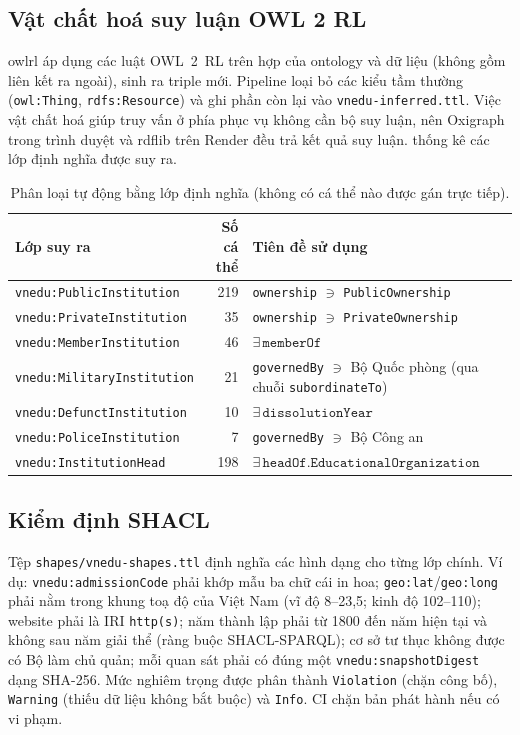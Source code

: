 \documentclass[12pt,a4paper]{article}
\newcommand{\vn}[1]{\texttt{vnedu:\allowbreak #1}}
\begin{document}
\subsection{Vật chất hoá suy luận OWL 2 RL}
owlrl áp dụng các luật OWL~2~RL trên hợp của ontology và dữ liệu (không gồm liên kết ra ngoài), sinh ra
\metricInferredTriples{} triple mới. Pipeline loại bỏ các kiểu tầm thường (\texttt{owl:Thing}, \texttt{rdfs:Resource}) và
ghi phần còn lại vào \texttt{vnedu-inferred.ttl}. Việc vật chất hoá giúp truy vấn ở phía phục vụ không cần bộ suy luận,
nên Oxigraph trong trình duyệt và rdflib trên Render đều trả kết quả suy luận.  thống kê các lớp định
nghĩa được suy ra.

\begin{table}[htbp]
\centering\small
\caption{Phân loại tự động bằng lớp định nghĩa (không có cá thể nào được gán trực tiếp).}\label{tab:inferred}
\begin{tabular}{lrl}
\toprule
Lớp suy ra & Số cá thể & Tiên đề sử dụng \\
\midrule
\vn{PublicInstitution}   & 219 & \texttt{ownership} \(\ni\) \texttt{PublicOwnership} \\
\vn{PrivateInstitution}  &  35 & \texttt{ownership} \(\ni\) \texttt{PrivateOwnership} \\
\vn{MemberInstitution}   &  46 & \(\exists\,\texttt{memberOf}\) \\
\vn{MilitaryInstitution} &  21 & \texttt{governedBy} \(\ni\) Bộ Quốc phòng (qua chuỗi \texttt{subordinateTo}) \\
\vn{DefunctInstitution}  &  10 & \(\exists\,\texttt{dissolutionYear}\) \\
\vn{PoliceInstitution}   &   7 & \texttt{governedBy} \(\ni\) Bộ Công an \\
\vn{InstitutionHead}     & 198 & \(\exists\,\texttt{headOf}.\texttt{EducationalOrganization}\) \\
\bottomrule
\end{tabular}
\end{table}

\subsection{Kiểm định SHACL}
Tệp \texttt{shapes/vnedu-shapes.ttl} định nghĩa các hình dạng cho từng lớp chính. Ví dụ: \vn{admissionCode} phải khớp mẫu
ba chữ cái in hoa; \texttt{geo:lat}/\texttt{geo:long} phải nằm trong khung toạ độ của Việt Nam (vĩ độ 8--23,5; kinh độ
102--110); website phải là IRI \texttt{http(s)}; năm thành lập phải từ 1800 đến năm hiện tại và không sau năm giải thể
(ràng buộc SHACL-SPARQL); cơ sở tư thục không được có Bộ làm chủ quản; mỗi quan sát phải có đúng một
\vn{snapshotDigest} dạng SHA-256. Mức
nghiêm trọng được phân thành \texttt{Violation} (chặn công bố), \texttt{Warning} (thiếu dữ liệu không bắt buộc) và
\texttt{Info}. CI chặn bản phát hành nếu có vi phạm.
\end{document}
